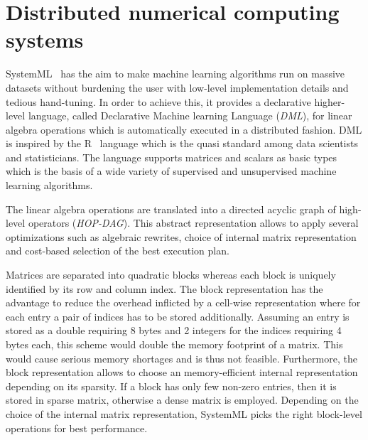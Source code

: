 \section{Distributed numerical computing systems}

SystemML~\cite{ghoting:2011a} has the aim to make machine learning algorithms run on massive datasets without burdening the user with low-level implementation details and tedious hand-tuning.
In order to achieve this, it provides a declarative higher-level language, called Declarative Machine learning Language (\emph{DML}), for linear algebra operations which is automatically executed in a distributed fashion.
DML is inspired by the R~\cite{r:1993a} language which is the quasi standard among data scientists and statisticians.
The language supports matrices and scalars as basic types which is the basis of a wide variety of supervised and unsupervised machine learning algorithms.

The linear algebra operations are translated into a directed acyclic graph of high-level operators (\emph{HOP-DAG}).
This abstract representation allows to apply several optimizations such as algebraic rewrites, choice of internal matrix representation and cost-based selection of the best execution plan.

Matrices are separated into quadratic blocks whereas each block is uniquely identified by its row and column index.
The block representation has the advantage to reduce the overhead inflicted by a cell-wise representation where for each entry a pair of indices has to be stored additionally.
Assuming an entry is stored as a double requiring 8 bytes and 2 integers for the indices requiring 4 bytes each, this scheme would double the memory footprint of a matrix.
This would cause serious memory shortages and is thus not feasible.
Furthermore, the block representation allows to choose an memory-efficient internal representation depending on its sparsity.
If a block has only few non-zero entries, then it is stored in sparse matrix, otherwise a dense matrix is employed.
Depending on the choice of the internal matrix representation, SystemML picks the right block-level operations for best performance.


